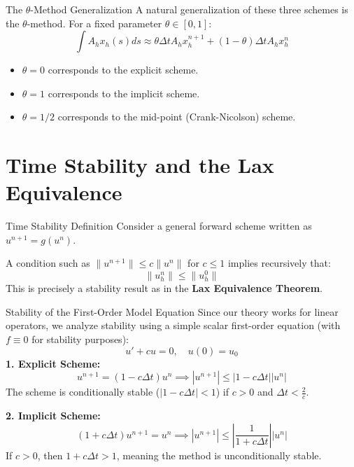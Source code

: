 \documentclass[aspectratio=169]{beamer}
\begin{document}
\begin{frame}{The $\theta$-Method Generalization}
    A natural generalization of these three schemes is the $\theta$-method. For a fixed parameter $\theta \in [0, 1]$:
    \[
        \int A_h x_h(s) ds \approx \theta \Delta t A_h x_h^{n+1} + (1 - \theta) \Delta t A_h x_h^n 
    \]
    \vspace{0.3cm}
    \begin{itemize}
        \item $\theta = 0$ corresponds to the explicit scheme.
        \item $\theta = 1$ corresponds to the implicit scheme.
        \item $\theta = 1/2$ corresponds to the mid-point (Crank-Nicolson) scheme.
    \end{itemize}
\end{frame}

\section{Time Stability and the Lax Equivalence}

\begin{frame}{Time Stability Definition}
    Consider a general forward scheme written as $u^{n+1} = g(u^n)$.
    
    A condition such as $\|u^{n+1}\| \le c\|u^n\|$ for $c \le 1$ implies recursively that:
    \[
        \|u_h^n\| \le \|u_h^0\|
    \]
    This is precisely a stability result as in the \textbf{Lax Equivalence Theorem}.
\end{frame}

\begin{frame}{Stability of the First-Order Model Equation}
    Since our theory works for linear operators, we analyze stability using a simple scalar first-order equation (with $f \equiv 0$ for stability purposes):
    \[
        u' + cu = 0, \quad u(0) = u_0 
    \]
    \textbf{1. Explicit Scheme:}
    \[
        u^{n+1} = (1 - c\Delta t)u^n \implies |u^{n+1}| \le |1 - c\Delta t| |u^n| 
    \]
    The scheme is conditionally stable ($|1 - c\Delta t| < 1$) if $c > 0$ and $\Delta t < \frac{2}{c}$.
    
    \textbf{2. Implicit Scheme:}
    \[
        (1 + c\Delta t)u^{n+1} = u^n \implies |u^{n+1}| \le \left| \frac{1}{1 + c\Delta t} \right| |u^n| 
    \]
    If $c > 0$, then $1 + c\Delta t > 1$, meaning the method is unconditionally stable.
\end{frame}
\end{document}
